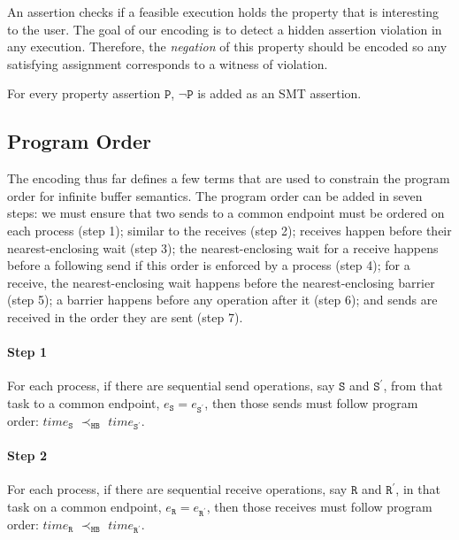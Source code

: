 An assertion checks if a feasible execution holds the property that is interesting to the user. The goal of our encoding is to detect a hidden assertion violation in any execution. Therefore, the \textit{negation} of this property should be encoded so any satisfying assignment corresponds to a witness of violation. 

\begin{definition} \label{def:assert}
For every property assertion $\mathtt{P}$, $\neg \mathtt{P}$ is added as
an SMT assertion.
\end{definition}

\subsection{Program Order}
The encoding thus far defines a few terms that are used to constrain the program order for infinite buffer semantics. The program order can be added in seven steps: we must ensure that two sends to a common endpoint must be ordered on each process (step 1); similar to the receives (step 2); receives happen before their nearest-enclosing wait (step 3); the nearest-enclosing wait for a receive happens before a following send if this order is enforced by a process (step 4); for a receive, the nearest-enclosing wait happens before the nearest-enclosing barrier (step 5); a barrier happens before any operation after it (step 6); and sends are received in the order they are sent (step 7). 

\paragraph*{Step 1} For each process, if there are sequential send
operations, say $\mathtt{S}$ and $\mathtt{S^\prime}$, from that task
to a common endpoint, $e_\mathtt{S} = e_\mathtt{S^\prime}$, then those
sends must follow program order: $\mathit{time}_\mathtt{S}$
$\prec_\mathtt{HB}$ $\mathit{time}_\mathtt{S^\prime}$.

\paragraph*{Step 2} For each process, if there are sequential receive
operations, say $\mathtt{R}$ and $\mathtt{R^\prime}$, in that task
on a common endpoint, $e_\mathtt{R} = e_\mathtt{R^\prime}$, then those
receives must follow program order: $\mathit{time}_\mathtt{R}$
$\prec_\mathtt{HB}$ $\mathit{time}_\mathtt{R^\prime}$.

